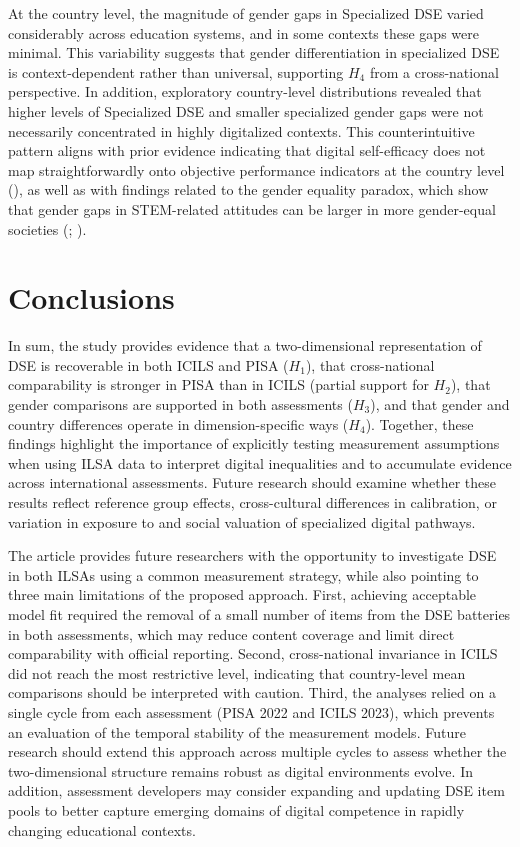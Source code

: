 \documentclass[
  letterpaper,
  DIV=11,
  numbers=noendperiod]{scrartcl}
\begin{document}
At the country level, the magnitude of gender gaps in Specialized DSE
varied considerably across education systems, and in some contexts these
gaps were minimal. This variability suggests that gender differentiation
in specialized DSE is context-dependent rather than universal,
supporting \(H_4\) from a cross-national perspective. In addition,
exploratory country-level distributions revealed that higher levels of
Specialized DSE and smaller specialized gender gaps were not necessarily
concentrated in highly digitalized contexts. This counterintuitive
pattern aligns with prior evidence indicating that digital self-efficacy
does not map straightforwardly onto objective performance indicators at
the country level (), as well as with findings related to the gender equality paradox,
which show that gender gaps in STEM-related attitudes can be larger in
more gender-equal societies (; ).

\section{Conclusions}\label{conclusions}

In sum, the study provides evidence that a two-dimensional
representation of DSE is recoverable in both ICILS and PISA (\(H_1\)),
that cross-national comparability is stronger in PISA than in ICILS
(partial support for \(H_2\)), that gender comparisons are supported in
both assessments (\(H_3\)), and that gender and country differences
operate in dimension-specific ways (\(H_4\)). Together, these findings
highlight the importance of explicitly testing measurement assumptions
when using ILSA data to interpret digital inequalities and to accumulate
evidence across international assessments. Future research should
examine whether these results reflect reference group effects,
cross-cultural differences in calibration, or variation in exposure to
and social valuation of specialized digital pathways.

The article provides future researchers with the opportunity to
investigate DSE in both ILSAs using a common measurement strategy, while
also pointing to three main limitations of the proposed approach. First,
achieving acceptable model fit required the removal of a small number of
items from the DSE batteries in both assessments, which may reduce
content coverage and limit direct comparability with official reporting.
Second, cross-national invariance in ICILS did not reach the most
restrictive level, indicating that country-level mean comparisons should
be interpreted with caution. Third, the analyses relied on a single
cycle from each assessment (PISA 2022 and ICILS 2023), which prevents an
evaluation of the temporal stability of the measurement models. Future
research should extend this approach across multiple cycles to assess
whether the two-dimensional structure remains robust as digital
environments evolve. In addition, assessment developers may consider
expanding and updating DSE item pools to better capture emerging domains
of digital competence in rapidly changing educational contexts.
\end{document}
